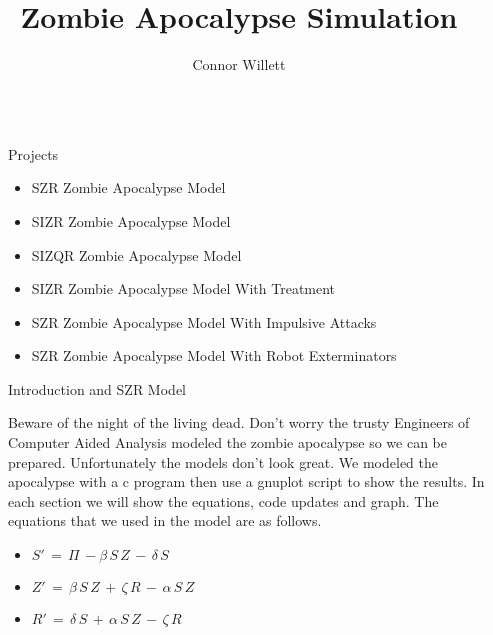 \documentclass[final]{beamer}
\title{Zombie Apocalypse Simulation}
\author{Connor Willett}
\institute{University of Mary Engineering}
\newlength{\sepwid}
\newlength{\onecolwid}
\begin{document}

\setlength{\belowcaptionskip}{2ex} 
\setlength\belowdisplayshortskip{2ex} 

\begin{frame}[t] 
\begin{columns}[t] 
\begin{column}{\sepwid}\end{column} 
\begin{column}{\onecolwid} 

\begin{alertblock}{Projects}

\begin{small}
\begin{itemize}
\item SZR Zombie Apocalypse Model 
\item SIZR Zombie Apocalypse Model 
\item SIZQR Zombie Apocalypse Model 
\item SIZR Zombie Apocalypse Model With Treatment
\item SZR Zombie Apocalypse Model With Impulsive Attacks
\item SZR Zombie Apocalypse Model With Robot Exterminators
\end{itemize}
\end{small}

\end{alertblock}

\begin{block}{Introduction and SZR Model}

Beware of the night of the living dead. Don't worry the trusty Engineers
of Computer Aided Analysis modeled the zombie apocalypse so we can be 
prepared. Unfortunately the models don't look great.
We modeled the apocalypse with a c program then use a gnuplot script to show the results.
In each section we will show the equations, code updates and graph.
The equations that we used in the model are as follows.

\begin{small}
\begin{itemize}
\item $S'\,=\,\Pi\,-\beta\,S\,Z\,-\,\delta\,S$ 
\item $Z'\,=\,\beta\,S\,Z\,+\,\zeta\,R\,-\,\alpha\,S\,Z$
\item $R'\,=\,\delta\,S\,+\,\alpha\,S\,Z\,-\,\zeta\,R$
\end{itemize}
\end{small}


\end{block}
\end{column}
\end{columns}
\end{frame}
\end{document}
